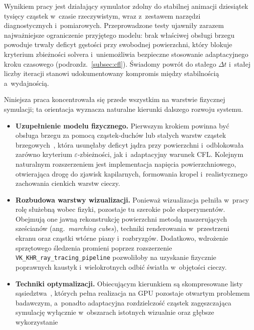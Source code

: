 Wynikiem pracy jest działający symulator zdolny do stabilnej animacji dziesiątek
tysięcy cząstek w~czasie rzeczywistym, wraz z~zestawem narzędzi diagnostycznych
i~pomiarowych. Przeprowadzone testy ujawniły zarazem najważniejsze ograniczenie
przyjętego modelu: brak właściwej obsługi brzegu powoduje trwały deficyt
gęstości przy swobodnej powierzchni, który blokuje kryterium zbieżności solvera
i~uniemożliwia bezpieczne stosowanie adaptacyjnego kroku czasowego
(podrozdz.~\ref{subsec:cfl}). Świadomy powrót do stałego $\Delta t$ i~stałej
liczby iteracji stanowi udokumentowany kompromis między stabilnością
a~wydajnością.

Niniejsza praca koncentrowała się przede wszystkim na warstwie fizycznej
symulacji; ta orientacja wyznacza naturalne kierunki dalszego rozwoju systemu.

\begin{itemize}
    \item \textbf{Uzupełnienie modelu fizycznego.} Pierwszym krokiem powinna być
          obsługa brzegu za pomocą cząstek-duchów lub stałych warstw cząstek
          brzegowych~\cite{schechter2012ghost}, która usunęłaby deficyt jądra
          przy powierzchni i~odblokowała zarówno kryterium
          $\varepsilon$-zbieżności, jak i~adaptacyjny warunek CFL. Kolejnym
          naturalnym rozszerzeniem jest implementacja napięcia powierzchniowego,
          otwierająca drogę do zjawisk kapilarnych, formowania kropel
          i~realistycznego zachowania cienkich warstw cieczy.
    \item \textbf{Rozbudowa warstwy wizualizacji.} Ponieważ wizualizacja pełniła
        w~pracy rolę służebną wobec fizyki, pozostaje tu szerokie pole
        eksperymentów. Obejmują one jawną rekonstrukcję powierzchni metodą
        maszerujących sześcianów (ang.~\textit{marching cubes}), techniki
        renderowania w~przestrzeni ekranu oraz cząstki wtórne piany i~rozbryzgów.
        Dodatkowo, wdrożenie sprzętowego śledzenia promieni poprzez rozszerzenie
        \texttt{VK\_KHR\_ray\_tracing\_pipeline} pozwoliłoby na uzyskanie fizycznie
        poprawnych kaustyk i~wielokrotnych odbić światła w~objętości cieczy.
    \item \textbf{Techniki optymalizacji.} Obiecującym kierunkiem są
          skompresowane listy sąsiedztwa~\cite{band2019compressed}, których
          pełna realizacja na GPU pozostaje otwartym problemem badawczym,
          a~ponadto adaptacyjna rozdzielczość cząstek zagęszczająca symulację
          wyłącznie w~obszarach istotnych wizualnie oraz głębsze wykorzystanie

\end{itemize}
